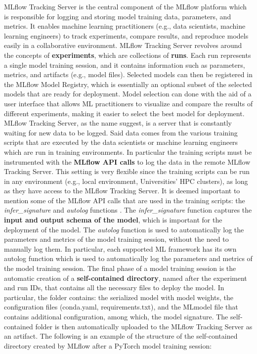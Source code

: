 MLflow Tracking Server is the central component of the MLflow platform which is responsible for logging and storing model training data, parameters, and metrics. 
It enables machine learning practitioners (e.g., data scientists, machine learning engineers) to track experiments, compare results, and reproduce models easily in a collaborative environment.
MLflow Tracking Server revolves around the concepts of \textbf{experiments}, which are collections of \textbf{runs}. 
Each run represents a single model training session, and it contains information such as parameters, metrics, and artifacts (e.g., model files).
Selected models can then be registered in the MLflow Model Registry, which is essentially an optional subset of the selected models that are ready for deployment.
Model selection can done with the aid of a user interface that allows ML practitioners to visualize and compare the results of different experiments, making it easier to select the best model for deployment.
MLflow Tracking Server, as the name suggest, is a server that is constantly waiting for new data to be logged. 
Said data comes from the various training scripts that are executed by the data scientists or machine learning engineers which are run in  training environments.
In particular the training scripts must be instrumented with the \textbf{MLflow API calls} to log the data in the remote MLflow Tracking Server.
This setting is very flexible since the training scripts can be run in any environment (e.g., local environment, Universities' HPC clusters), as long as they have access to the MLflow Tracking Server.
It is deemed important to mention some of the MLflow API calls that are used in the training scripts: the \textit{infer\_signature} and \textit{autolog} functions \cite{mlflow_docs}.
The \textit{infer\_signature} function captures the \textbf{input and output schema of the model}, which is important for the deployment of the model.
The \textit{autolog} function is used to automatically log the parameters and metrics of the model training session, without the need to manually log them. In particular, each supported ML framework has its own autolog function which is used to automatically log the parameters and metrics of the model training session.
The final phase of a model training session is the automatic creation of a \textbf{self-contained directory}, named after the experiment and run IDs, that contains all the necessary files to deploy the model. 
In particular, the folder contains: the serialized model with model weights, the configuration files (conda.yaml, requirements.txt), and the MLmodel file that contains additional configuration, among which, the model signature.
The self-contained folder is then automatically uploaded to the MLflow Tracking Server as an artifact.
The following is an example of the structure of the self-contained directory created by MLflow after a PyTorch model training session: \\

